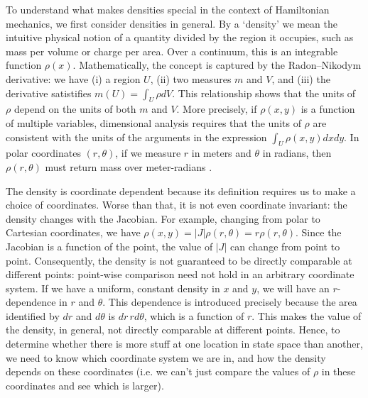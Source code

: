 \documentclass[letterpaper]{article}
\begin{document}
To understand what makes densities special in the context of Hamiltonian mechanics, we first consider densities in general. By a `density' we mean the intuitive physical notion of a quantity divided by the region it occupies, such as mass per volume or charge per area. Over a continuum, this is an integrable function $\rho(x)$. Mathematically, the concept is captured by the Radon–Nikodym derivative: we have (i) a region $U$, (ii) two measures $m$ and $V$, and (iii) the derivative satistifies $m(U) = \int_U \rho dV$. This relationship shows that the units of $\rho$ depend on the units of both $m$ and $V$. More precisely, if $\rho(x, y)$ is a function of multiple variables, dimensional analysis requires that the units of $\rho$ are consistent with the units of the arguments in the expression $\int_U \rho(x, y) dx dy$. In polar coordinates $(r, \theta)$, if we measure $r$ in meters and $\theta$ in radians, then $\rho(r, \theta)$ must return mass over meter-radians .

The density is coordinate dependent because its definition requires us to make a choice of coordinates. Worse than that, it is not even coordinate invariant: the density changes with the Jacobian. For example, changing from polar to Cartesian coordinates, we have $\rho(x,y) = |J| \rho(r, \theta) = r \rho(r, \theta)$. Since the Jacobian is a function of the point, the value of $|J|$ can change from point to point. Consequently, the density is not guaranteed to be directly comparable at different points: point-wise comparison need not hold in an arbitrary coordinate system. If we have a uniform, constant density in $x$ and $y$, we will have an $r$-dependence in $r$ and $\theta$. This dependence is introduced precisely because the area identified by $dr$ and $d\theta$ is $dr \,r d\theta$, which is a function of $r$. This makes the value of the density, in general, not directly comparable at different points. Hence, to determine whether there is more stuff at one location in state space than another, we need to know which coordinate system we are in, and how the density depends on these coordinates (i.e. we can't just compare the values of $\rho$ in these coordinates and see which is larger).
\end{document}
